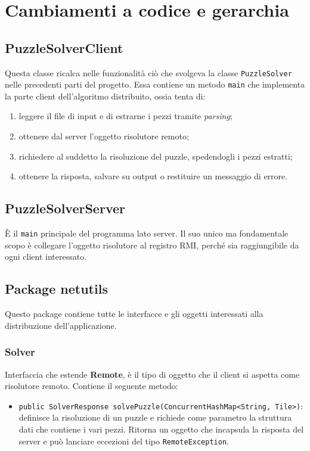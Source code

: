 \documentclass[a4paper, 12pt]{article}
\newcommand{\strong}[1]{ \textbf{#1}}
\begin{document}
\section{Cambiamenti a codice e gerarchia}
\subsection{PuzzleSolverClient}
Questa classe ricalca nelle funzionalità ciò che svolgeva la classe
\verb|PuzzleSolver| nelle precedenti parti del progetto. Essa contiene un metodo
\verb|main| che implementa la parte client dell'algoritmo distribuito, ossia
tenta di:
\begin{enumerate}
\item leggere il file di input e di estrarne i pezzi tramite \emph{parsing};
\item ottenere dal server l'oggetto risolutore remoto;
\item richiedere al suddetto la risoluzione del puzzle, spedendogli i pezzi
estratti;
\item ottenere la risposta, salvare su output o restituire un messaggio di
errore.
\end{enumerate}
\subsection{PuzzleSolverServer}
È il \verb|main| principale del programma lato server. Il suo unico ma
fondamentale scopo è collegare l'oggetto risolutore al registro RMI, perché sia
raggiungibile da ogni client interessato.
\subsection{Package netutils}
Questo package contiene tutte le interfacce e gli oggetti interessati
alla distribuzione dell'applicazione.
\subsubsection{Solver}
Interfaccia che estende \strong{Remote}, è il tipo di oggetto che il client si
aspetta come risolutore remoto. Contiene il seguente metodo:
\begin{itemize}
\item \verb|public SolverResponse solvePuzzle(ConcurrentHashMap<String, Tile>)|:
\\ definisce la risoluzione di un puzzle e richiede come parametro la
struttura dati che contiene i vari pezzi. Ritorna un oggetto che incapsula la
risposta del server e può lanciare eccezioni del tipo \verb|RemoteException|.
\end{itemize}
\end{document}

